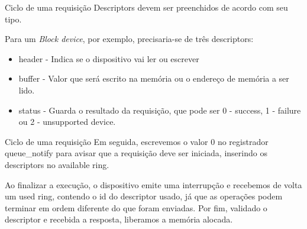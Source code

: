 \documentclass[brazil,nolapesd,aspectratio=169,noartschool]{lapesd-slides}
\begin{document}
\begin{frame}{Ciclo de uma requisição}
	Descriptors devem ser preenchidos de acordo com seu tipo.
	
	\vspace{1em}

	Para um \textit{Block device}, por exemplo, precisaria-se de três descriptors:
	\begin{itemize}
		\item header - Indica se o dispositivo vai ler ou escrever
		\item buffer - Valor que será escrito na memória ou o endereço de memória a ser lido.
		\item status - Guarda o resultado da requisição, que pode ser 0 - success, 1 - failure ou 2 - unsupported device.
	\end{itemize}
\end{frame}

\begin{frame}{Ciclo de uma requisição}
	Em seguida, escrevemos o valor 0 no registrador queue{\_}notify para avisar que a requisição deve ser
	iniciada, inserindo os descriptors no available ring.

	\vspace{1em}

	Ao finalizar a execução, o dispositivo emite uma interrupção e recebemos de volta um used ring,
	contendo o id do descriptor usado, já que as operações podem terminar em ordem diferente do que
	foram enviadas. Por fim, validado o descriptor e recebida a resposta, liberamos a memória alocada.
\end{frame}


\thanksframe

\end{document}
